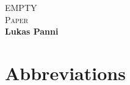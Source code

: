 \documentclass[12pt, oneside, titlepage]{book}
\newcommand{\Author}{Lukas Panni}
\newcommand{\Type}{Paper}
\newcommand{\Title}{EMPTY}
\begin{document}
\pagestyle{plain}

\begin{titlepage}
\begin{center}
\vspace*{-2cm}
{\Huge \Title}\\[1cm]
{\Huge\scshape \Type}\\[1cm]
{\large\bfseries \Author}\\[1cm]
\vfill
\end{center}
\end{titlepage}



\setcounter{page}{1}
\newpage
\tableofcontents
\listoffigures
\listoftables

\chapter*{Abbreviations}

\clearpage

\setcounter{page}{1}






\appendix

\end{document}
